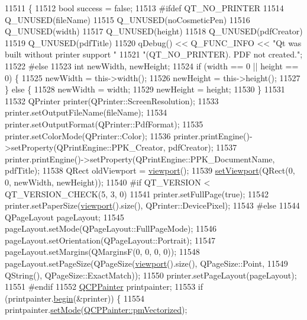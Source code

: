 \begin{DoxyCode}
11511                                                    \{
11512   \textcolor{keywordtype}{bool} success = \textcolor{keyword}{false};
11513 \textcolor{preprocessor}{#ifdef QT\_NO\_PRINTER}
11514   Q\_UNUSED(fileName)
11515   Q\_UNUSED(noCosmeticPen)
11516   Q\_UNUSED(width)
11517   Q\_UNUSED(height)
11518   Q\_UNUSED(pdfCreator)
11519   Q\_UNUSED(pdfTitle)
11520   qDebug() << Q\_FUNC\_INFO << "Qt was built without printer support "
11521                              "(QT\_NO\_PRINTER). PDF not created.";
11522 \textcolor{preprocessor}{#else}
11523   \textcolor{keywordtype}{int} newWidth, newHeight;
11524   \textcolor{keywordflow}{if} (width == 0 || height == 0) \{
11525     newWidth = this->width();
11526     newHeight = this->height();
11527   \} \textcolor{keywordflow}{else} \{
11528     newWidth = width;
11529     newHeight = height;
11530   \}
11531 
11532   QPrinter printer(QPrinter::ScreenResolution);
11533   printer.setOutputFileName(fileName);
11534   printer.setOutputFormat(QPrinter::PdfFormat);
11535   printer.setColorMode(QPrinter::Color);
11536   printer.printEngine()->setProperty(QPrintEngine::PPK\_Creator, pdfCreator);
11537   printer.printEngine()->setProperty(QPrintEngine::PPK\_DocumentName, pdfTitle);
11538   QRect oldViewport = \hyperlink{class_q_custom_plot_a953ecdbc28018e7e84cb6213ad3d88c2}{viewport}();
11539   \hyperlink{class_q_custom_plot_a3f9bc4b939dd8aaba9339fd09f273fc4}{setViewport}(QRect(0, 0, newWidth, newHeight));
11540 \textcolor{preprocessor}{#if QT\_VERSION < QT\_VERSION\_CHECK(5, 3, 0)}
11541   printer.setFullPage(\textcolor{keyword}{true});
11542   printer.setPaperSize(\hyperlink{class_q_custom_plot_a953ecdbc28018e7e84cb6213ad3d88c2}{viewport}().size(), QPrinter::DevicePixel);
11543 \textcolor{preprocessor}{#else}
11544   QPageLayout pageLayout;
11545   pageLayout.setMode(QPageLayout::FullPageMode);
11546   pageLayout.setOrientation(QPageLayout::Portrait);
11547   pageLayout.setMargins(QMarginsF(0, 0, 0, 0));
11548   pageLayout.setPageSize(QPageSize(\hyperlink{class_q_custom_plot_a953ecdbc28018e7e84cb6213ad3d88c2}{viewport}().size(), QPageSize::Point,
11549                                    QString(), QPageSize::ExactMatch));
11550   printer.setPageLayout(pageLayout);
11551 \textcolor{preprocessor}{#endif}
11552   \hyperlink{class_q_c_p_painter}{QCPPainter} printpainter;
11553   \textcolor{keywordflow}{if} (printpainter.\hyperlink{class_q_c_p_painter_a0a41146ccd619dceab6e25ec7b46b044}{begin}(&printer)) \{
11554     printpainter.\hyperlink{class_q_c_p_painter_af6b1f7d2bbc548b10aa55d8b6ad49577}{setMode}(\hyperlink{class_q_c_p_painter_a156cf16444ff5e0d81a73c615fdb156daeda679cd55dcd468341d07d48a30b6ab}{QCPPainter::pmVectorized});

\end{DoxyCode}
